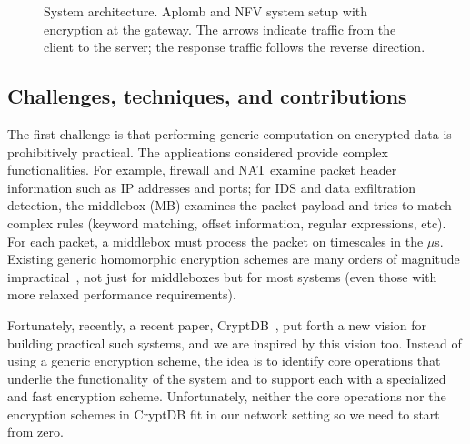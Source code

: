 \begin{figure}[t!]
\centering
{}
%
\hfill  
{}
     
\caption{System architecture. Aplomb and NFV system setup with \sys encryption  at the gateway. The arrows indicate traffic from the client to the server; the response traffic follows the reverse direction. \label{fig:sys-overview}}
\end{figure}


    \subsection{Challenges, techniques, and contributions}
    
The first challenge is that performing generic computation on encrypted data is prohibitively practical. The applications considered provide complex functionalities. For example, firewall and NAT examine packet header information such as IP addresses and ports; for IDS and data exfiltration detection, the middlebox (MB) examines the packet payload and tries to match complex rules (keyword matching, offset information,  regular expressions, etc). For each packet, a middlebox must process the packet on timescales in the $\mu$s. Existing generic homomorphic encryption schemes are many orders of magnitude impractical~\cite{aesFHE}, not just for middleboxes but for most systems (even those with more relaxed performance requirements).

Fortunately, recently, a recent paper, CryptDB~\cite{popa:cryptdb}, put forth a new vision for building practical such systems, and we are inspired by this vision too. Instead of using a generic encryption scheme, the idea is to identify core operations that underlie the functionality of the system and to support each with a specialized and fast encryption scheme. Unfortunately, neither the core operations nor the encryption schemes in CryptDB fit in our network setting so we need to start from zero.

